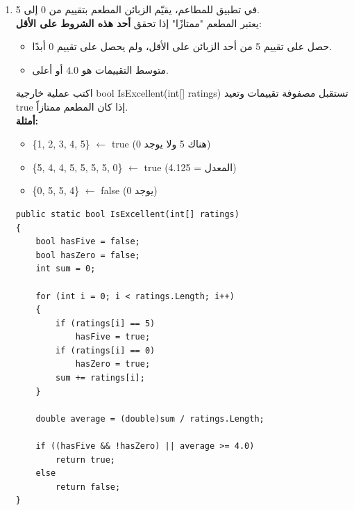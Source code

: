 \documentclass[14pt]{extarticle}
\begin{document}
\begin{enumerate}[resume, itemsep=2em]
    \item
    في تطبيق للمطاعم، يقيّم الزبائن المطعم بتقييم من 0 إلى 5.\\
    يعتبر المطعم "ممتازًا" إذا تحقق \textbf{أحد هذه الشروط على الأقل}:
    \begin{itemize}
        \item حصل على تقييم 5 من أحد الزبائن على الأقل، ولم يحصل على تقييم 0 أبدًا.
        \item متوسط التقييمات هو $4.0$ أو أعلى.
    \end{itemize}
    اكتب عملية خارجية \textenglish{bool IsExcellent(int[] ratings)} تستقبل مصفوفة تقييمات وتعيد \textenglish{true} إذا كان المطعم ممتازاً.\\
    \textbf{أمثلة:}
    \begin{itemize}
        \item \textenglish{\{1, 2, 3, 4, 5\}} $\leftarrow$ \textenglish{true} (هناك 5 ولا يوجد 0)
        \item \textenglish{\{5, 4, 4, 5, 5, 5, 5, 0\}} $\leftarrow$ \textenglish{true} (المعدل = 4.125)
        \item \textenglish{\{0, 5, 5, 4\}} $\leftarrow$ \textenglish{false} (يوجد 0)
    \end{itemize}
    \ifwithsols
    \begin{boxSolution}
    \begin{english}
    \begin{verbatim}
public static bool IsExcellent(int[] ratings)
{
    bool hasFive = false;
    bool hasZero = false;
    int sum = 0;

    for (int i = 0; i < ratings.Length; i++)
    {
        if (ratings[i] == 5)
            hasFive = true;
        if (ratings[i] == 0)
            hasZero = true;
        sum += ratings[i];
    }

    double average = (double)sum / ratings.Length;

    if ((hasFive && !hasZero) || average >= 4.0)
        return true;
    else
        return false;
}
    \end{verbatim}
    \end{english}
    \end{boxSolution}
    \fi

\end{enumerate}
\end{document}
